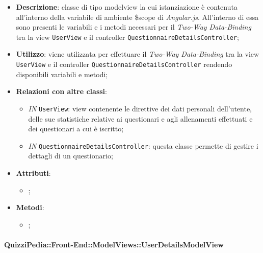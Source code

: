 	\begin{itemize}
		\item \textbf{Descrizione}: classe di tipo modelview la cui istanziazione è contenuta all'interno della variabile di ambiente \$scope di \textit{Angular.js}. All'interno di essa sono presenti le variabili e i metodi necessari per il \textit{Two-Way Data-Binding} tra la view \texttt{UserView} e il controller \texttt{QuestionnaireDetailsController};
		\item \textbf{Utilizzo}: viene utilizzata per effettuare il \textit{Two-Way Data-Binding} tra la view \texttt{UserView} e il controller \texttt{QuestionnaireDetailsController} rendendo disponibili variabili e metodi;
		\item \textbf{Relazioni con altre classi}: 
		\begin{itemize}
			\item \textit{IN} \texttt{UserView}: view contenente le direttive dei dati personali dell'utente, delle sue statistiche relative ai questionari e agli allenamenti effettuati e dei questionari a cui è iscritto; 
			\item \textit{IN} \texttt{QuestionnaireDetailsController}: questa classe permette di gestire i dettagli di un questionario;
		\end{itemize}
		\item \textbf{Attributi}: 
		\begin{itemize}
			\item ;
		\end{itemize}
		\item \textbf{Metodi}: 
		\begin{itemize}
			\item ;
		\end{itemize}
	\end{itemize}
	
		\paragraph{QuizziPedia::Front-End::ModelViews::UserDetailsModelView}
		
		\label{QuizziPedia::Front-End::ModelViews::UserDetailsModelView}
		
